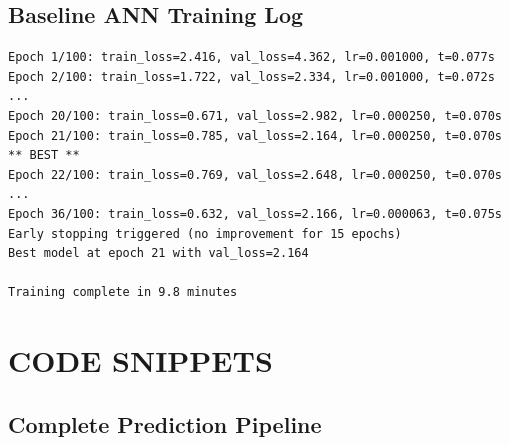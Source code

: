 \documentclass[12pt,a4paper]{report}
\begin{document}
\section{Baseline ANN Training Log}

{\footnotesize
\begin{verbatim}
Epoch 1/100: train_loss=2.416, val_loss=4.362, lr=0.001000, t=0.077s
Epoch 2/100: train_loss=1.722, val_loss=2.334, lr=0.001000, t=0.072s
...
Epoch 20/100: train_loss=0.671, val_loss=2.982, lr=0.000250, t=0.070s
Epoch 21/100: train_loss=0.785, val_loss=2.164, lr=0.000250, t=0.070s ** BEST **
Epoch 22/100: train_loss=0.769, val_loss=2.648, lr=0.000250, t=0.070s
...
Epoch 36/100: train_loss=0.632, val_loss=2.166, lr=0.000063, t=0.075s
Early stopping triggered (no improvement for 15 epochs)
Best model at epoch 21 with val_loss=2.164

Training complete in 9.8 minutes
\end{verbatim}}

\chapter{CODE SNIPPETS}

\section{Complete Prediction Pipeline}
\end{document}
